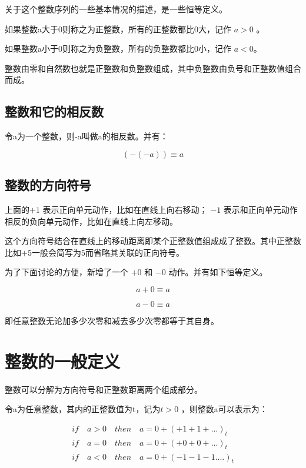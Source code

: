 \documentclass[12pt,oneside]{book}
\begin{document}
关于这个整数序列的一些基本情况的描述，是一些恒等定义。

如果整数a大于0则称之为正整数，所有的正整数都比0大，记作 $a>0$ 。

如果整数a小于0则称之为负整数，所有的负整数都比0小，记作 $a<0$。

整数由零和自然数也就是正整数和负整数组成，其中负整数由负号和正整数值组合而成。


\subsection{整数和它的相反数}
令a为一个整数，则-a叫做a的相反数。并有： 

\begin{equation}
(-(-a)) \equiv a
\end{equation}


\subsection{整数的方向符号}
上面的$+1$ 表示正向单元动作，比如在直线上向右移动； $-1$ 表示和正向单元动作相反的负向单元动作，比如在直线上向左移动。

这个方向符号结合在直线上的移动距离即某个正整数值组成成了整数。其中正整数比如$+5$一般会简写为$5$而省略其关联的正向符号。

为了下面讨论的方便，新增了一个 $+0$ 和 $-0$ 动作。并有如下恒等定义。

\begin{equation}
a +0 \equiv a
\end{equation}

\begin{equation}
a -0 \equiv a
\end{equation}

即任意整数无论加多少次零和减去多少次零都等于其自身。

\section{整数的一般定义}
整数可以分解为方向符号和正整数距离两个组成部分。

令a为任意整数，其内的正整数值为t，记为$t>0$ ，则整数a可以表示为：

\begin{align*}
if \quad a>0 \quad then \quad a=0+(+1+1+...)_t\\
if \quad a=0 \quad then \quad a=0+(+0+0+...)_t\\
if \quad a<0 \quad then \quad a=0+(-1-1-1....)_t
\end{align*}
\end{document}
